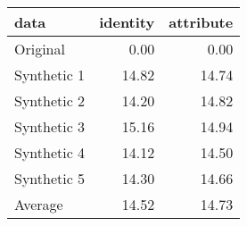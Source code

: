 \begin{tabular}{lrr}
  \toprule
data & identity & attribute \\ 
  \midrule
Original & 0.00 & 0.00 \\ 
  Synthetic 1 & 14.82 & 14.74 \\ 
  Synthetic 2 & 14.20 & 14.82 \\ 
  Synthetic 3 & 15.16 & 14.94 \\ 
  Synthetic 4 & 14.12 & 14.50 \\ 
  Synthetic 5 & 14.30 & 14.66 \\ 
  Average & 14.52 & 14.73 \\ 
   \bottomrule
\end{tabular}
